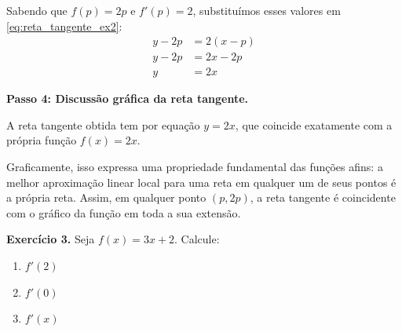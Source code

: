 \documentclass[12pt,a4paper]{article}
\begin{document}
Sabendo que $f(p) = 2p$ e $f'(p) = 2$, substituímos esses valores em \eqref{eq:reta_tangente_ex2}:
\begin{align*}
    y - 2p &= 2(x - p) \\[0.25cm]
    y - 2p &= 2x - 2p \\[0.25cm]
    y &= 2x
\end{align*}

\vspace{0.3cm}
\textbf{Passo 4: Discussão gráfica da reta tangente.}

A reta tangente obtida tem por equação $y = 2x$, que coincide exatamente com a própria função $f(x) = 2x$.

Graficamente, isso expressa uma propriedade fundamental das funções afins: a melhor aproximação linear local para uma reta em qualquer um de seus pontos é a própria reta. Assim, em qualquer ponto $(p, 2p)$, a reta tangente é coincidente com o gráfico da função em toda a sua extensão.

\begin{center}
\end{center}

\vspace{0.5cm}
\noindent\textbf{Exercício 3.} Seja $f(x) = 3x + 2$. Calcule:
\begin{enumerate}
    \renewcommand{\theenumi}{\alph{enumi}}
    \renewcommand{\labelenumi}{\theenumi)}
    \item $f'(2)$
    \item $f'(0)$
    \item $f'(x)$
\end{enumerate}
\setcounter{equation}{0}
\end{document}
